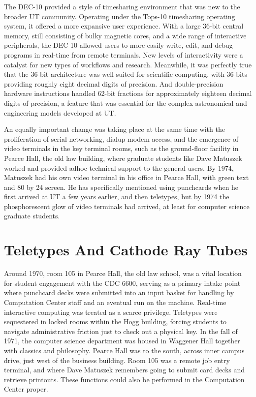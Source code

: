The DEC-10 provided a style of timesharing environment that was new to the broader UT community. Operating under the Tops-10 timesharing operating system, it offered a more expansive user experience. With a large 36-bit central memory, still consisting of bulky magnetic cores, and a wide range of interactive peripherals, the DEC-10 allowed users to more easily write, edit, and debug programs in real-time from remote terminals. New levels of interactivity were a catalyst for new types of workflows and research. Meanwhile, it was perfectly true that the 36-bit architecture was well-suited for scientific computing, with 36-bits providing roughly eight decimal digits of precision. And double-precision hardware instructions handled 62-bit fractions for approximately eighteen decimal digits of precision, a feature that was essential for the complex astronomical and engineering models developed at UT. 

An equally important change was taking place at the same time with the proliferation of serial networking, dialup modem access, and the emergence of video terminals in the key terminal rooms, such as the ground-floor facility in Pearce Hall, the old law building, where graduate students like Dave Matuszek worked and provided adhoc technical support to the general users. By 1974, Matuszek had his own video terminal in his office in Pearce Hall, with green text and 80 by 24 screen. He has specifically mentioned using punchcards when he first arrived at UT a few years earlier, and then teletypes, but by 1974 the phosphorescent glow of video terminals had arrived, at least for computer science graduate students. 

\section{Teletypes And Cathode Ray Tubes}

Around 1970, room 105 in Pearce Hall, the old law school, was a vital location for student engagement with the CDC 6600, serving as a primary intake point where punchcard decks were submitted into an input basket for handling by Computation Center staff and an eventual run on the machine. Real-time interactive computing was treated as a scarce privilege. Teletypes were sequestered in locked rooms within the Hogg building, forcing students to navigate administrative friction just to check out a physical key. In the fall of 1971, the computer science department was housed in Waggener Hall together with classics and philosophy. Pearce Hall was to the south, across inner campus drive, just west of the business building. Room 105 was a remote job entry terminal, and where Dave Matuszek remembers going to submit card decks and retrieve printouts. These functions could also be performed in the Computation Center proper.

